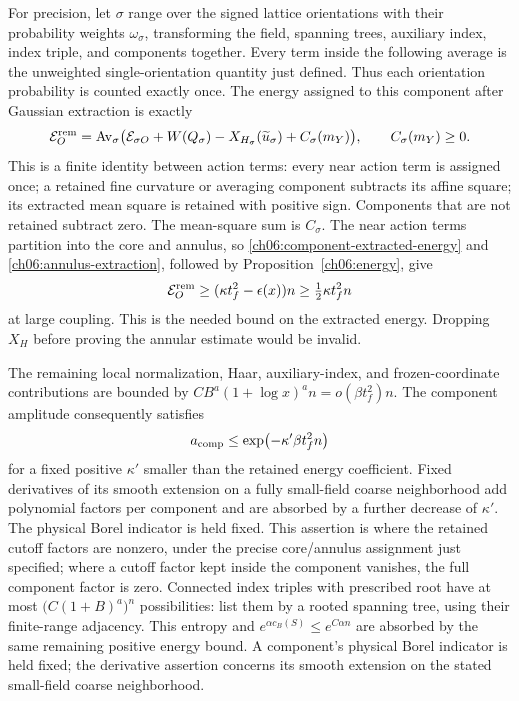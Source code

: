 For precision, let $\sigma$ range over the signed lattice orientations
with their probability weights $\omega_\sigma$, transforming the field,
spanning trees, auxiliary index, index triple, and components together. Every term inside the
following average is the unweighted single-orientation quantity just
defined. Thus each orientation probability is counted exactly once. The energy assigned to this component
after Gaussian extraction is exactly
\begin{equation}
 \mathcal E_O^{\rm rem}
 =\operatorname{Av}_{\sigma}\bigl(
       \mathcal E_{\sigma O}+W(Q_\sigma)
       -X_{H_\sigma}(\widetilde u_\sigma)+C_\sigma(m_Y)\bigr),
 \qquad C_\sigma(m_Y)\ge0 .
 \label{ch06:component-extracted-energy}
\end{equation}
This is a finite identity between action terms: every near action term is assigned once;
a retained fine curvature or averaging component subtracts its affine square;
its extracted mean square is retained with positive sign.
Components that are not retained subtract zero. The mean-square sum is $C_\sigma$.
The near action terms partition into the core and annulus, so
\eqref{ch06:component-extracted-energy} and
\eqref{ch06:annulus-extraction}, followed by Proposition~\ref{ch06:energy},
give
\[
 \mathcal E_O^{\rm rem}\ge(\kappa t_f^2-\epsilon(x))n
                         \ge\tfrac12\kappa t_f^2 n
\]
at large coupling. This is the needed bound on the extracted energy.
Dropping $X_H$ before proving the annular estimate would be invalid.

The remaining local normalization, Haar, auxiliary-index, and frozen-coordinate
contributions are bounded by $C B^a(1+\log x)^a n=o(\beta t_f^2)n$.
The component amplitude consequently satisfies
\[
 a_{\rm comp}\le\exp\bigl(-\kappa'\beta t_f^2n\bigr)
\]
for a fixed positive $\kappa'$ smaller than the retained energy
coefficient. Fixed derivatives of its smooth extension on a fully
small-field coarse neighborhood add polynomial factors per component
and are absorbed by a further decrease of $\kappa'$. The physical Borel
indicator is held fixed. This assertion is where the retained cutoff factors are nonzero,
under the precise core/annulus assignment just specified; where a
cutoff factor kept inside the component vanishes, the full component factor is zero.
Connected index triples with prescribed root have at most
$\bigl(C(1+B)^a\bigr)^{n}$ possibilities: list them by a rooted spanning tree,
using their finite-range adjacency. This entropy and
$e^{\alpha c_B(S)}\le e^{C\alpha n}$ are absorbed by the same
remaining positive energy bound. A component's physical Borel indicator is held fixed;
the derivative assertion concerns its smooth extension on the stated
small-field coarse neighborhood.

